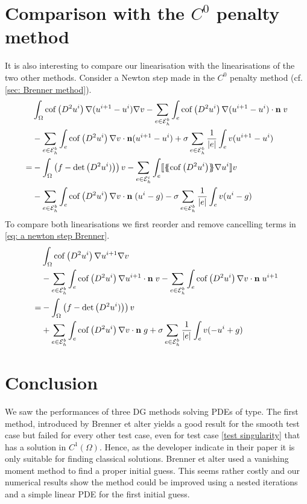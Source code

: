 \section{Comparison with the $C^0$ penalty method}
It is also interesting to compare our linearisation with the linearisations of the two other methods.
Consider a Newton step made in the $C^0$ penalty method (cf. \ref{sec: Brenner method}).
\begin{align}
	&\int_\Omega \operatorname{cof} \left( D^2 u^i \right) \nabla (u^{i+1}-u^i) \nabla v - \sum_{e \in \mathcal{E}_h^b} \int_e \operatorname{cof} \left( D^2 u^i \right) \nabla (u^{i+1}-u^i) \cdot \mathbf n \; v \nonumber \\
	&- \sum_{e \in \mathcal{E}_h^b} \int_e \operatorname{cof} \left( D^2 u^i \right) \nabla v \cdot \mathbf n (u^{i+1}-u^i) + \sigma \sum_{e \in \mathcal{E}_h^b} \frac 1 {|e|} \int_e v (u^{i+1}-u^i)\nonumber \\
	=&-\int_\Omega \left(f - \det{\left(D^2 u^i)\right)}\right) v  
			- \sum_{e \in \mathcal{E}_h^i} \int_e \llbracket  \{\!\!\{ \operatorname{cof} \left( D^2 u^i \right) \}\!\!\} \nabla {u^i}  \rrbracket v \nonumber \\
&	- \sum_{e \in \mathcal{E}_h^b} \int_e \operatorname{cof} \left( D^2 u^i \right) \nabla v \cdot \mathbf n \; (u^i-g) - \sigma \sum_{e \in \mathcal{E}_h^b} \frac 1 {|e|} \int_e v (u^{i}-g) \label{eq: a newton step Brenner}
\end{align}
To compare both linearisations we first reorder and remove cancelling terms in \eqref{eq: a newton step Brenner}.
\begin{align}
	&\int_\Omega \operatorname{cof} \left( D^2 u^i \right) \nabla u^{i+1} \nabla v \\
	&- \sum_{e \in \mathcal{E}_h^b} \int_e \operatorname{cof} \left( D^2 u^i \right) \nabla u^{i+1} \cdot \mathbf n \; v 
		- \sum_{e \in \mathcal{E}_h^b} \int_e \operatorname{cof} \left( D^2 u^i \right) \nabla v \cdot \mathbf n \; u^{i+1} \\
	=
	&-\int_\Omega \left(f - \det{\left(D^2 u^i)\right)}\right) v \\
	&+ \sum_{e \in \mathcal{E}_h^b} \int_e \operatorname{cof} \left( D^2 u^i \right) \nabla v \cdot \mathbf n \; g 
	+\sigma \sum_{e \in \mathcal{E}_h^b} \frac 1 {|e|} \int_e v (-u^{i}+g) \label{eq: ordered newton step Brenner}
\end{align}

\section{Conclusion}

We saw the performances of three DG methods solving PDEs of \MA type.
The first method, introduced by Brenner et alter yields a good result for the smooth test case but failed for every other test case, even for test case \ref{test singularity} that has a solution in $C^1(\Omega)$. Hence, as the developer indicate in their paper it is only suitable for finding classical solutions.
Brenner et alter used a vanishing moment method to find a proper initial guess. This seems rather costly and our numerical results show the method could be improved using a nested iterations and a simple linear PDE for the first initial guess.

